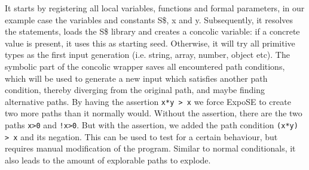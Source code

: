 It starts by registering all local variables, functions and formal parameters, in our example case the variables and constants S\$, x and y. Subsequently, it resolves the statements, loads the S\$ library and creates a concolic variable: if a concrete value is present, it uses this as starting seed. Otherwise, it will try all primitive types as the first input generation (i.e. string, array, number, object etc). The symbolic part of the concolic wrapper saves all encountered path conditions, which will be used to generate a new input which satisfies another path condition, thereby diverging from the original path, and maybe finding alternative paths.
By having the assertion \lstinline{x*y > x} we force ExpoSE to create two more paths than it normally would. Without the assertion, there are the two paths \lstinline{x>0} and \lstinline{!x>0}. But with the assertion, we added the path condition \lstinline{(x*y) > x} and its negation. This can be used to test for a certain behaviour, but requires manual modification of the program. Similar to normal conditionals, it also leads to the amount of explorable paths to explode.
